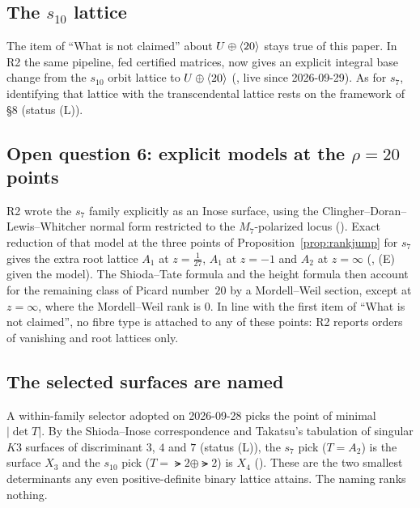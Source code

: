 \subsection{The \texorpdfstring{$s_{10}$}{s10} lattice}
The item of ``What is not claimed'' about $U\oplus\langle 20\rangle$ stays true of this paper. In R2 the same pipeline,
fed certified matrices, now gives an explicit integral base change from the $s_{10}$ orbit lattice to
$U\oplus\langle 20\rangle$ (, live since 2026-09-29). As for $s_7$, identifying that
lattice with the transcendental lattice rests on the framework of \S8 (status (L)).

\subsection{Open question 6: explicit models at the \texorpdfstring{$\rho=20$}{rho=20} points}
R2 wrote the $s_7$ family explicitly as an Inose surface, using the Clingher--Doran--Lewis--Whitcher normal form
restricted to the $M_7$-polarized locus (). Exact reduction of that model at the
three points of Proposition~\ref{prop:rankjump} for $s_7$ gives the extra root lattice $A_1$ at $z=\tfrac1{27}$,
$A_1$ at $z=-1$ and $A_2$ at $z=\infty$ (, (E) given the model). The
Shioda--Tate formula and the height formula then account for the remaining class of Picard number~$20$ by a
Mordell--Weil section, except at $z=\infty$, where the Mordell--Weil rank is $0$. In line with the first item of
``What is not claimed'', no fibre type is attached to any of these points: R2 reports orders of vanishing and
root lattices only.

\subsection{The selected surfaces are named}
A within-family selector adopted on 2026-09-28 picks the point of minimal $|\det T|$. By the Shioda--Inose
correspondence and Takatsu's tabulation of singular $K3$ surfaces of discriminant $3$, $4$ and $7$ (status (L)),
the $s_7$ pick ($T=A_2$) is the surface $X_3$ and the $s_{10}$ pick ($T=\lat2\oplus\lat2$) is $X_4$
(). These are the two smallest determinants any even
positive-definite binary lattice attains. The naming ranks nothing.

